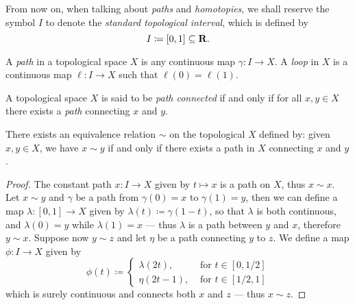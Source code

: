 \begin{notation}
From now on, when talking about \emph{paths} and \emph{homotopies}, we shall
reserve the symbol \(I\) to denote the \emph{standard topological interval},
which is defined by
\[
  I \coloneq [0, 1] \subseteq \mathbf{R}.
\]
\end{notation}

\begin{definition}
\label{def:path-loop}
A \emph{path} in a topological space \(X\) is any continuous map \(\gamma: I \to
X\). A \emph{loop} in \(X\) is a continuous map \(\ell: I \to X\) such that
\(\ell(0) = \ell(1)\).
\end{definition}

\begin{definition}
\label{def:path-connected}
A topological space \(X\) is said to be \emph{path connected} if and only if
for all \(x, y \in X\) there exists a \emph{path} connecting \(x\) and \(y\).
\end{definition}

\begin{proposition}
\label{prop:path-connected-equiv-relation}
There exists an equivalence relation \(\sim\) on the topological \(X\) defined
by: given \(x, y \in X\), we have \(x \sim y\) if and only if there exists a
path in \(X\) connecting \(x\) and \(y\).
\end{proposition}

\begin{proof}
The constant path \(x: I \to X\) given by \(t \mapsto x\) is a path on
\(X\), thus \(x \sim x\). Let \(x \sim y\) and \(\gamma\) be a path from
\(\gamma(0) = x\) to \(\gamma(1) = y\), then we can define a map \(\lambda: [0,
1] \to X\) given by \(\lambda(t) \coloneq \gamma(1 - t)\), so that \(\lambda\)
is both continuous, and \(\lambda(0) = y\) while \(\lambda(1) = x\) --- thus
\(\lambda\) is a path between \(y\) and \(x\), therefore \(y \sim x\). Suppose
now \(y \sim z\) and let \(\eta\) be a path connecting \(y\) to \(z\). We
define a map \(\phi: I \to X\) given by
\[
  \phi(t) \coloneq
  \begin{cases}
    \lambda(2t), &\text{ for } t \in [0, 1/2] \\
    \eta(2t - 1), &\text{ for } t \in [1/2, 1]
  \end{cases}
\]
which is surely continuous and connects both \(x\) and \(z\) --- thus \(x \sim
z\).
\end{proof}

